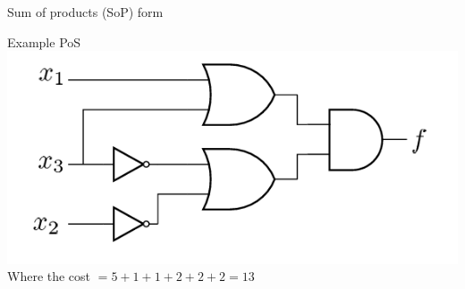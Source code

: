 \begin{parag}{Sum of products (SoP) form}
\begin{subparag}{Example PoS}
     \includegraphics[scale=0.6]{gateAnd2025-03-10.png}
     Where the cost $ = 5 +  1 + 1 + 2 + 2 + 2 = 13$
 \end{subparag}
\end{parag}

